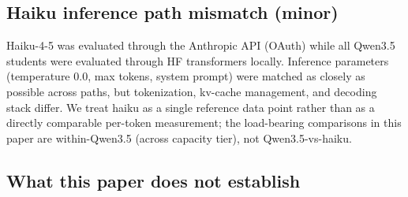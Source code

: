 \documentclass[10pt]{article}
\begin{document}
\subsection{Haiku inference path mismatch (minor)}
Haiku-4-5 was evaluated through the Anthropic API (OAuth) while all Qwen3.5 students were evaluated through HF transformers locally. Inference parameters (temperature $0.0$, max tokens, system prompt) were matched as closely as possible across paths, but tokenization, kv-cache management, and decoding stack differ. We treat haiku as a single reference data point rather than as a directly comparable per-token measurement; the load-bearing comparisons in this paper are within-Qwen3.5 (across capacity tier), not Qwen3.5-vs-haiku.

\subsection{What this paper does not establish}\label{sec:what-not}
\end{document}
